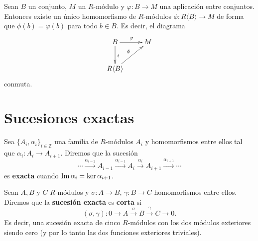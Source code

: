 \begin{teorema}
	 \label{teo:univ-prop-free-mod} Sean
	\(B\) un conjunto, \(M\) un \(R\)-módulo y \(\varphi : B \to M\) una aplicación entre
	conjuntos. Entonces existe un único homomorfismo de \(R\)-módulos \(\phi : R \langle
	B \rangle \to M\) de forma que \(\phi(b) = \varphi(b)\) para todo \(b \in B\). Es
	decir, el diagrama
	\[
		\xymatrix{ B \ar@{->}[r]^{\varphi} \ar@{->}[d]^{i} & M \\ R \langle B \rangle \ar@{->}[ru]^{\phi} & }
	\]
	conmuta.
\end{teorema}

\section{Sucesiones exactas}

\begin{definicion}
	Sea \(\{A_{i}, \alpha_{i}\}_{i \in \mathbb{Z}}\) una familia de \(R\)-módulos \(A_{i}\)
	y homomorfismos entre ellos tal que \(\alpha_{i}: A_{i} \rightarrow A_{i+1}\).
	Diremos que la sucesión
	\[
		\cdots \xrightarrow{\alpha_{i-2}}A_{i-1}\xrightarrow{\alpha_{i-1}}A_{i} \xrightarrow
		{\alpha_{i}}A_{i+1}\xrightarrow{\alpha_{i+1}}\cdots
	\]
	es \textbf{exacta} cuando \(\operatorname{Im} \alpha_{i} = \ker \alpha_{i+1}\).
\end{definicion}

\begin{definicion}
	Sean \(A,B\) y \(C\) \(R\)-módulos y \(\sigma: A \rightarrow B\),
	\(\gamma: B \rightarrow C\) homomorfismos entre ellos. Diremos que la \textbf{sucesión
	exacta} es \textbf{corta} si
	\[
		(\sigma, \gamma): 0 \rightarrow A \xrightarrow{\sigma}B \xrightarrow{\gamma}C
		\rightarrow 0.
	\]
	Es decir, una sucesión exacta de cinco \(R\)-módulos con los dos módulos
	exteriores siendo cero (y por lo tanto las dos funciones exteriores triviales).
\end{definicion}

